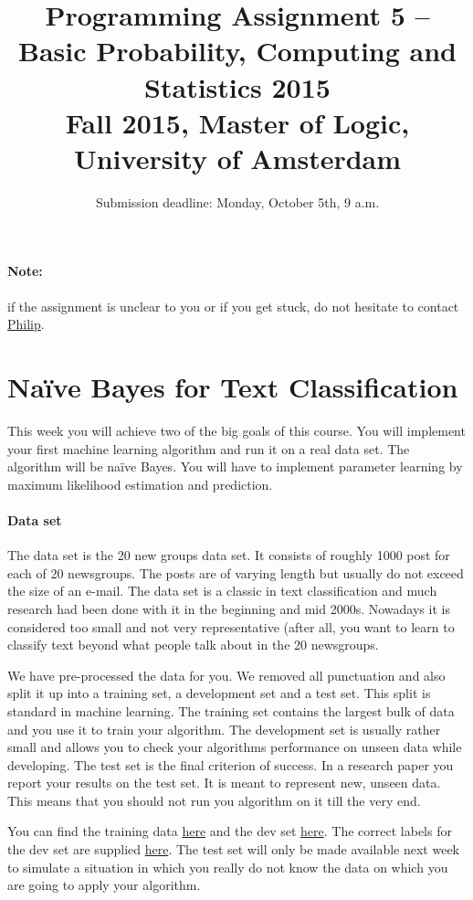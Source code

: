 \documentclass[11pt, leqno, a4paper]{article}
\title{Programming Assignment 5 -- Basic Probability, Computing and Statistics 2015 \\[2mm]
\large{Fall 2015, Master of Logic, University of Amsterdam}}
\author{}
\date{Submission deadline: Monday, October 5th, 9 a.m.}
\begin{document}
\maketitle

\paragraph{Note:} if the assignment is unclear to you or if you get stuck, do not hesitate to contact \href{mailto:P.Schulz@uva.nl}{Philip}.

\section{Na\"ive Bayes for Text Classification}

This week you will achieve two of the big goals of this course. You will implement your first machine 
learning algorithm and run it on a real data set. The algorithm will be na\"ive Bayes. You will have to 
implement parameter learning by maximum likelihood estimation and prediction.

\paragraph{Data set} The data set is the 20 new groups data set. It consists of roughly 1000 post for each
of 20 newsgroups. The posts are of varying length but usually do not exceed the size of an e-mail. The
data set is a classic in text classification and much research had been done with it in the beginning and
mid 2000s. Nowadays it is considered too small and not very representative (after all, you want to learn
to classify text beyond what people talk about in the 20 newsgroups.

We have pre-processed the data for you. We removed all punctuation and also split it up into a training
set, a development set and a test set. This split is standard in machine learning. The training set contains
the largest bulk of data and you use it to train your algorithm. The development set is usually rather
small and allows you to check your algorithms performance on unseen data while developing. The test set
is the final criterion of success. In a research paper you report your results on the test set. It is meant
to represent new, unseen data. This means that you should not run you algorithm on it till the very end.


You can find the training data \href{https://github.com/BasicProbability/BasicProbability.github.io/blob/master/Homework/Programming/Assignment5/20news-18828.zip}{here} and the dev set \href{https://github.com/BasicProbability/BasicProbability.github.io/blob/master/Homework/Programming/Assignment5/20news-18828.zip}{here}. The correct labels for the dev set are supplied \href{https://github.com/BasicProbability/BasicProbability.github.io/blob/master/Homework/Programming/Assignment5/correct_dev_labels.txt}{here}.
The test set will only be made available next week
to simulate a situation in which you really do not know the data on which you are going to apply your 
algorithm.
\end{document}
